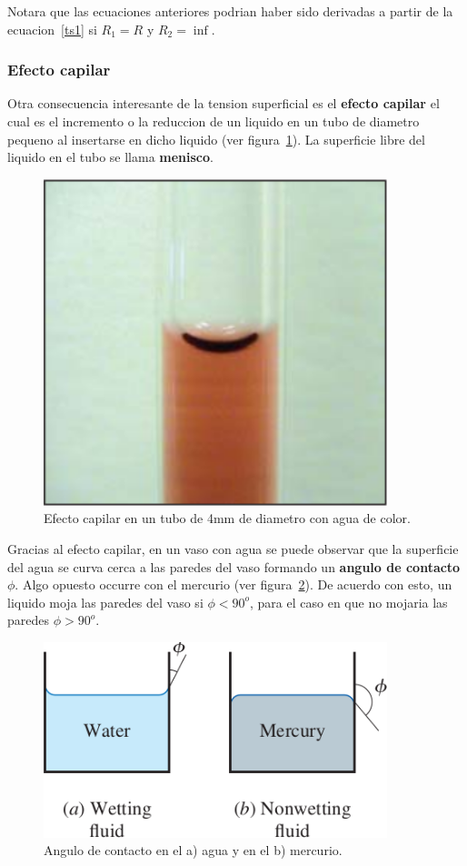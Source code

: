 \documentclass[10pt, oneside]{article}
\begin{document}
Notara que las ecuaciones anteriores podrian haber sido derivadas a partir de la ecuacion~\ref{ts1} si $R_1 = R$ y $R_2 = \inf$.


\subsubsection{Efecto capilar}
Otra consecuencia interesante de la tension superficial es el \textbf{efecto capilar} el cual es el incremento o la reduccion de un liquido en un tubo de diametro pequeno al insertarse en dicho liquido (ver figura~\ref{efc}). La superficie libre del liquido en el tubo se llama \textbf{menisco}. 

\begin{figure}[h]
\centering
\includegraphics[width=10cm]{ecapilar}
\caption{Efecto capilar en un tubo de 4mm de diametro con agua de color.}
\label{efc}
\end{figure}


Gracias al efecto capilar, en un vaso con agua se puede observar que la superficie del agua se curva cerca a las paredes del vaso formando un \textbf{angulo de contacto} $\phi$. Algo opuesto occurre con el mercurio (ver figura~\ref{eca}). De acuerdo con esto, un liquido moja las paredes del vaso si $\phi < 90^o$, para el caso en que no mojaria las paredes $\phi > 90^o$. 

\begin{figure}[h]
\centering
\includegraphics[width=10cm]{ecangulo}
\caption{Angulo de contacto en el a) agua y en el b) mercurio.}
\label{eca}
\end{figure}
\end{document}
